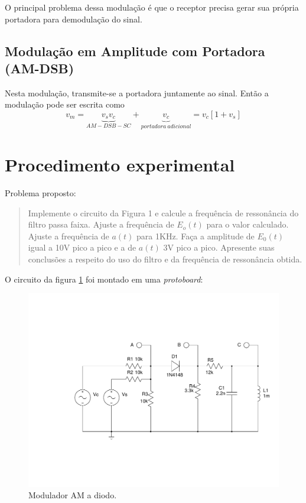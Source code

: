 \documentclass[]{report}
\begin{document}
O principal problema dessa modulação é que o receptor precisa gerar sua própria portadora para demodulação do sinal. 

\subsection{Modulação em Amplitude com Portadora (AM-DSB)}
Nesta modulação, transmite-se a portadora juntamente ao sinal. Então a modulação pode ser escrita como
\begin{equation}\label{eq_am_dsb_tempo}
v_m = \underbrace{v_s v_c}_{AM-DSB-SC} + \underbrace{v_c}_{portadora\ adicional} = v_c [1 + v_s]
\end{equation}



\section{Procedimento experimental}

Problema proposto:
\begin{quote}
Implemente o circuito da Figura 1 e calcule a frequência de ressonância do filtro passa faixa. Ajuste a frequência de $E_o(t)$ para o valor calculado. Ajuste a frequência de $a(t)$ para 1KHz. Faça a amplitude de $E_0(t)$ igual a 10V pico a pico e a de $a(t)$ 3V pico a pico. Apresente suas conclusões a respeito do uso do filtro e da frequência de ressonância obtida.
\end{quote}


O circuito da figura \ref{fig:demodulador_AM_diodo} foi montado em uma \textit{protoboard}:
\begin{figure}[H]
\begin{center}
\includegraphics[scale=0.4,clip]{./imagens/AM_Modulator_Diode}
\end{center}
\caption{Modulador AM a diodo.}
\label{fig:demodulador_AM_diodo}
\end{figure}
\end{document}
